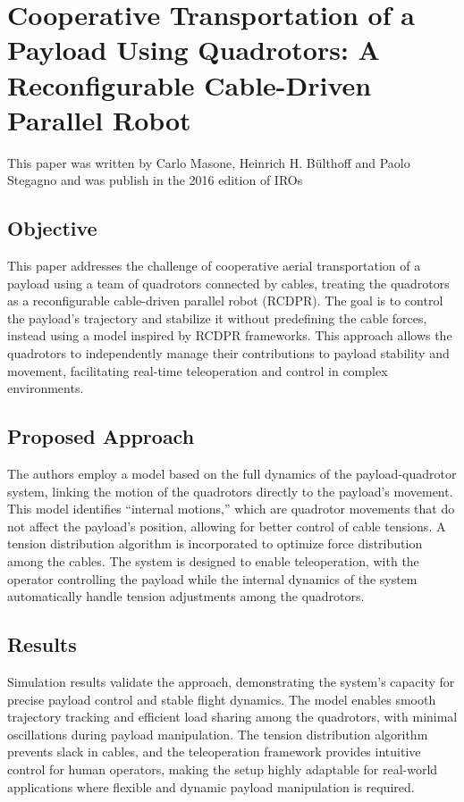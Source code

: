 \documentclass[a4paper,12pt]{article}
\begin{document}
\section{Cooperative Transportation of a Payload Using Quadrotors: A Reconfigurable Cable-Driven Parallel Robot}

This paper\cite{masone2016cooperative} was written by Carlo Masone, Heinrich H. Bülthoff and Paolo Stegagno and was publish in the 2016 edition of IROs

\subsection{Objective}
This paper addresses the challenge of cooperative aerial transportation of a payload using a team of quadrotors connected by cables, treating the quadrotors as a reconfigurable cable-driven parallel robot (RCDPR). The goal is to control the payload's trajectory and stabilize it without predefining the cable forces, instead using a model inspired by RCDPR frameworks. This approach allows the quadrotors to independently manage their contributions to payload stability and movement, facilitating real-time teleoperation and control in complex environments.

\subsection{Proposed Approach}
The authors employ a model based on the full dynamics of the payload-quadrotor system, linking the motion of the quadrotors directly to the payload’s movement. This model identifies “internal motions,” which are quadrotor movements that do not affect the payload's position, allowing for better control of cable tensions. A tension distribution algorithm is incorporated to optimize force distribution among the cables. The system is designed to enable teleoperation, with the operator controlling the payload while the internal dynamics of the system automatically handle tension adjustments among the quadrotors.

\subsection{Results}
Simulation results validate the approach, demonstrating the system’s capacity for precise payload control and stable flight dynamics. The model enables smooth trajectory tracking and efficient load sharing among the quadrotors, with minimal oscillations during payload manipulation. The tension distribution algorithm prevents slack in cables, and the teleoperation framework provides intuitive control for human operators, making the setup highly adaptable for real-world applications where flexible and dynamic payload manipulation is required.
\end{document}
